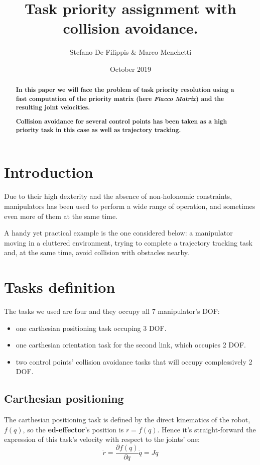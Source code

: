 \documentclass[12pt,a4paper, twocolumn, twoside]{article}
\newcommand{\diff}[2]{\frac{\partial{#1}}{\partial{#2}}}
\begin{document}
	
	\title{Task priority assignment with collision avoidance.}
	\author{Stefano De Filippis \& Marco Menchetti}
	\date{October 2019}
	\maketitle
	
\begin{abstract}
	\textbf{
	In this paper we will face the problem of task priority resolution using a fast computation of the priority matrix (here \textit{Flacco Matrix}) and the resulting joint velocities.}

\textbf{
	Collision avoidance for several control points has been taken as a high priority task in this case as well as trajectory tracking.}
\end{abstract}
\section*{Introduction}
Due to their high dexterity and the absence of non-holonomic constraints, manipulators has been used to perform a wide range of operation, and sometimes even more of them at the same time.

A handy yet practical example is the one considered below: a manipulator moving in a cluttered environment, trying to complete a trajectory tracking task and, at the same time, avoid collision with obstacles nearby.

\section{Tasks definition}
The tasks we used are four and they occupy all 7 manipulator's DOF:
\begin{itemize}
	\item one carthesian positioning task occuping 3 DOF.
	\item one carthesian orientation task for the second link, which occupies 2 DOF.
	\item two control points' collision avoidance tasks that will occupy complessively 2 DOF.
\end{itemize}
\subsection[Task 1]{Carthesian positioning}
The carthesian positioning task is defined by the direct kinematics of the robot, $f(q)$, so the \textbf{ed-effector}'s position is $r = f(q)$. Hence it's straight-forward the expression of this task's velocity with respect to the joints' one: 
\begin{equation}
\label{EQN: task1}
 \dot{r} = \diff{f(q)}{q} \dot{q} = J\dot{q}
\end{equation}
\end{document}
